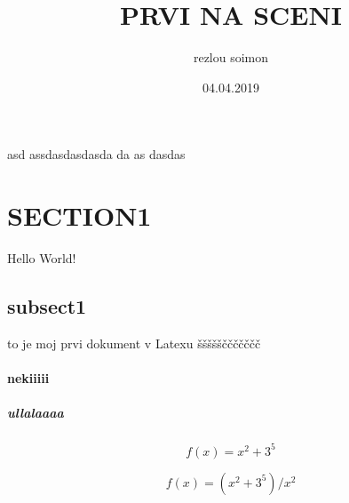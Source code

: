 \documentclass{article}
\title{PRVI NA SCENI}
\date{04.04.2019}
\author{rezlou soimon}
\begin{document}
        \maketitle
        \newpage

asd
assdasdasdasda
da as dasdas 

        \newpage    %

\section{SECTION1}
Hello World!

\subsection{subsect1}
to je moj prvi dokument v Latexu šššššččččččč

 \paragraph{nekiiiii}

\subparagraph{ullalaaaa}

\begin{equation*}    %
  f(x) = x^2+3^5
\end{equation*}

\begin{equation}    %
  f(x) = (x^2+3^5)/x^2
\end{equation}
\end{document}
